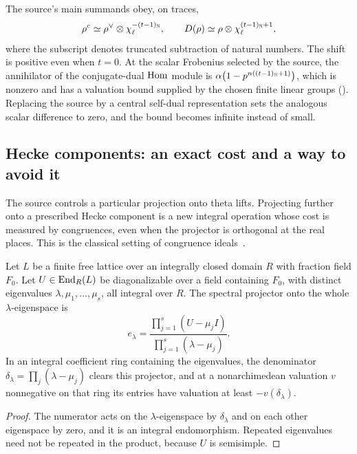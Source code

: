 \begin{remark}\label{sel:rem:sourceavoids}
The source's main summands obey, on traces,
\[
 \rho^c\simeq\rho^\vee\otimes\chi_\ell^{-(t-1)_{\mathbb{N}}},\qquad
 D(\rho)\simeq\rho\otimes\chi_\ell^{(t-1)_{\mathbb{N}}+1},
\]
where the subscript denotes truncated subtraction of natural numbers. The
shift is positive even when $t=0$. At the scalar Frobenius selected by the
source, the annihilator of the conjugate-dual $\operatorname{Hom}$ module is
$\alpha\bigl(1-p^{n((t-1)_{\mathbb{N}}+1)}\bigr)$, which is nonzero and has a
valuation bound supplied by the chosen finite linear groups
(). Replacing the
source by a central self-dual representation sets the analogous scalar
difference to zero, and the bound becomes infinite instead of small.
\end{remark}

\subsection{Hecke components: an exact cost and a way to avoid it}\label{sel:sec:hecke}

The source controls a particular projection onto theta lifts. Projecting
further onto a prescribed Hecke component is a new integral operation whose
cost is measured by congruences, even when the projector is orthogonal at
the real places. This is the classical setting of congruence
ideals~\cite{Hida2019Modular,AgasheModular}.

\begin{proposition}\label{sel:prop:projector}
Let $L$ be a finite free lattice over an integrally closed domain $R$ with
fraction field $F_0$. Let $U\in\operatorname{End}_R(L)$ be diagonalizable over a field
containing $F_0$, with distinct eigenvalues $\lambda,\mu_1,\dots,\mu_s$,
all integral over $R$. The spectral projector onto the whole
$\lambda$-eigenspace is
\[
 e_\lambda=\frac{\prod_{j=1}^s(U-\mu_jI)}{\prod_{j=1}^s(\lambda-\mu_j)} .
\]
In an integral coefficient ring containing the eigenvalues, the denominator
$\delta_\lambda=\prod_j(\lambda-\mu_j)$ clears this projector, and at a
nonarchimedean valuation $v$ nonnegative on that ring its entries have
valuation at least $-v(\delta_\lambda)$.
\end{proposition}

\begin{proof}
The numerator acts on the $\lambda$-eigenspace by $\delta_\lambda$ and on
each other eigenspace by zero, and it is an integral endomorphism. Repeated
eigenvalues need not be repeated in the product, because $U$ is semisimple.
\end{proof}

